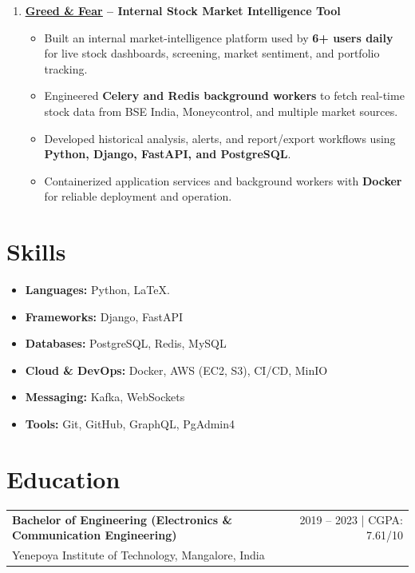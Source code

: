 \documentclass[11pt,a4paper]{article}
\begin{document}
\begin{enumerate}
    \item \textbf{\href{https://greedandfear.in/}{\underline{Greed \& Fear}} -- Internal Stock Market Intelligence Tool}
    \begin{itemize}
        \item Built an internal market-intelligence platform used by \textbf{6+ users daily} for live stock dashboards, screening, market sentiment, and portfolio tracking.
        \item Engineered \textbf{Celery and Redis background workers} to fetch real-time stock data from BSE India, Moneycontrol, and multiple market sources.
        \item Developed historical analysis, alerts, and report/export workflows using \textbf{Python, Django, FastAPI, and PostgreSQL}.
        \item Containerized application services and background workers with \textbf{Docker} for reliable deployment and operation.
    \end{itemize}
\end{enumerate}

\section{\Large{Skills}}

\begin{itemize}
    \item \textbf{Languages:} Python, LaTeX.
    \item \textbf{Frameworks:} Django, FastAPI
    \item \textbf{Databases:} PostgreSQL, Redis, MySQL
    \item \textbf{Cloud \& DevOps:} Docker, AWS (EC2, S3), CI/CD, MinIO
    \item \textbf{Messaging:} Kafka, WebSockets
    \item \textbf{Tools:} Git, GitHub, GraphQL, PgAdmin4
\end{itemize}

\section{\Large{Education}}

\begin{tabularx}{\textwidth}{@{}X r@{}}
    \textbf{Bachelor of Engineering (Electronics \& Communication Engineering)} & 2019 -- 2023 | CGPA: 7.61/10 \\
    Yenepoya Institute of Technology, Mangalore, India & \\
\end{tabularx}
\end{document}
